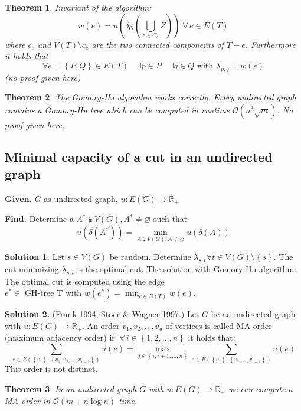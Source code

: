 \documentclass{article}
\newtheorem{theorem}{Theorem}
\newcommand{\set}[1]{\left\{#1\right\}}
\newcommand{\given}[1]{\textbf{Given.} #1\par}
\newcommand{\find}[1]{\textbf{Find.} #1\par}
\newcommand{\fall}{\;\forall\,}
\begin{document}
\begin{theorem}\label{lemma-4.18}
  Invariant of the algorithm:
  \[
    w(e) = u(\delta_G(\bigcup_{z \in C_e} Z)) \fall e \in E(T)
  \]
  where $c_e$ and $V(T) \setminus c_e$ are the two connected components of $T - e$.
  Furthermore it holds that
  \[
    \forall e = \set{P, Q} \in E(T)
      \quad \exists p \in P
      \quad \exists q \in Q \text{ with } \lambda_{p,q} = w(e)
  \]
  (no proof given here)
\end{theorem}

\begin{theorem}\label{4.19}
  The Gomory-Hu algorithm works correctly.
  Every undirected graph contains a Gomory-Hu tree which can be computed in runtime $\mathcal{O}(n^3 \sqrt{m})$. No proof given here.
\end{theorem}

\subsection{Minimal capacity of a cut in an undirected graph}

\given{$G$ as undirected graph, $u: E(G) \rightarrow \mathbb{R}_+$}
\find{
  Determine a $A^* \subsetneqq V(G), A^* \neq \diameter$ such that
  \[
    u(\delta(A^*)) = \min_{A \subsetneqq V(G), A \neq \diameter} u(\delta(A))
  \]
}

\textbf{Solution 1.}
  Let $s \in V(G)$ be random. Determine $\lambda_{s,t} \forall t \in V(G) \setminus \set{s}$.
  The cut minimizing $\lambda_{s,t}$ is the optimal cut.
  The solution with Gomory-Hu algorithm: The optimal cut is computed using the edge $e^* \in \text{ GH-tree T with } w(e^*) = \min_{e \in E(T)} w(e)$.

\textbf{Solution 2.}
  (Frank 1994, Stoer \& Wagner 1997.)
  Let $G$ be an undirected graph with $u: E(G) \rightarrow \mathbb{R}_+$.
  An order $v_1, v_2, \ldots, v_u$ of vertices is called MA-order (maximum adjacency order)
  if $\fall i \in \set{1, 2, \ldots, n}$ it holds that:
  \[
    \sum_{e \in E(\set{v_1}, \set{v_1, v_2, \ldots, v_{i-1}})} u(e)
      = \max_{j \in \set{i, i+1, \ldots, n}} \sum_{e \in E(\set{v_1}, \set{v_1, \ldots, v_{i-1}})} u(e)
  \]
  This order is not distinct.

\begin{theorem}\label{proposition-4.20}
  In an undirected graph $G$ with $u: E(G) \rightarrow \mathbb{R}_+$ we can compute a MA-order in $\mathcal{O}(m + n\log{n})$ time.
\end{theorem}
\end{document}
